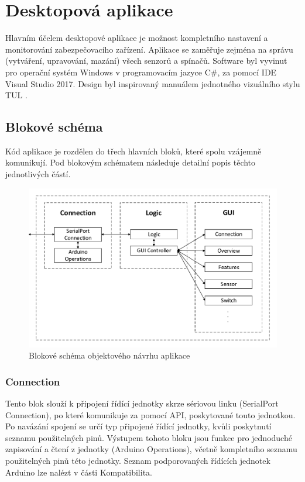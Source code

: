 \documentclass[FM,DP]{tulthesis}  %
\begin{document}

\chapter{Desktopová aplikace}
Hlavním účelem desktopové aplikace je možnost kompletního nastavení a monitorování zabezpečovacího zařízení. Aplikace se zaměřuje zejména na správu (vytváření, upravování, mazání) všech senzorů a spínačů. Software byl vyvinut pro operační systém Windows v programovacím jazyce C\#, za pomocí IDE Visual Studio 2017. Design byl inspirovaný manuálem jednotného vizuálního stylu TUL \cite{TULVisual}.

\section{Blokové schéma}
Kód aplikace je rozdělen do třech hlavních bloků, které spolu vzájemně komunikují. Pod blokovým schématem následuje detailní popis těchto jednotlivých částí.

\begin{figure}[H]
\begin{center}
\includegraphics[width=\textwidth]{vector/blokoveSchemaSecurityControl.pdf}
\caption{Blokové schéma objektového návrhu aplikace}
\label{image}
\end{center}
\end{figure}

\subsection{Connection}
Tento blok slouží k připojení řídící jednotky skrze sériovou linku (SerialPort Connection), po které komunikuje za pomocí API, poskytované touto jednotkou. Po navázání spojení se určí typ připojené řídící jednotky, kvůli poskytnutí seznamu použitelných pinů. Výstupem tohoto bloku jsou funkce pro jednoduché zapisování a čtení z jednotky (Arduino Operations), včetně kompletního seznamu použitelných pinů této jednotky. Seznam podporovaných řídících jednotek Arduino lze nalézt v části Kompatibilita.
\end{document}
